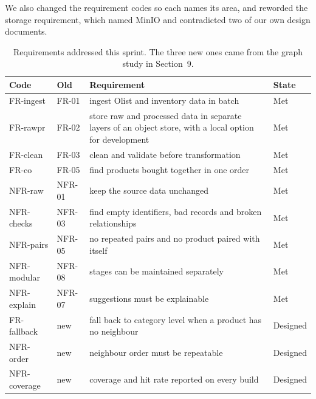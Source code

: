 \documentclass[11pt,a4paper]{article}
\begin{document}
We also changed the requirement codes so each names its area, and reworded the storage
requirement, which named MinIO and contradicted two of our own design documents.

\begin{table}[h]
\centering\footnotesize
\begin{tabular}{@{}llp{8.2cm}l@{}}
\toprule
\textbf{Code} & \textbf{Old} & \textbf{Requirement} & \textbf{State} \\
\midrule
FR-ingest & FR-01 & ingest Olist and inventory data in batch & Met \\
FR-rawpr & FR-02 & store raw and processed data in separate layers of an object store, with a local option for development & Met \\
FR-clean & FR-03 & clean and validate before transformation & Met \\
FR-co & FR-05 & find products bought together in one order & Met \\
NFR-raw & NFR-01 & keep the source data unchanged & Met \\
NFR-checks & NFR-03 & find empty identifiers, bad records and broken relationships & Met \\
NFR-pairs & NFR-05 & no repeated pairs and no product paired with itself & Met \\
NFR-modular & NFR-08 & stages can be maintained separately & Met \\
NFR-explain & NFR-07 & suggestions must be explainable & Met \\
FR-fallback & new & fall back to category level when a product has no neighbour & Designed \\
NFR-order & new & neighbour order must be repeatable & Designed \\
NFR-coverage & new & coverage and hit rate reported on every build & Designed \\
\bottomrule
\end{tabular}
\caption{Requirements addressed this sprint. The three new ones came from the graph study in
Section~9.}
\end{table}

\end{document}
